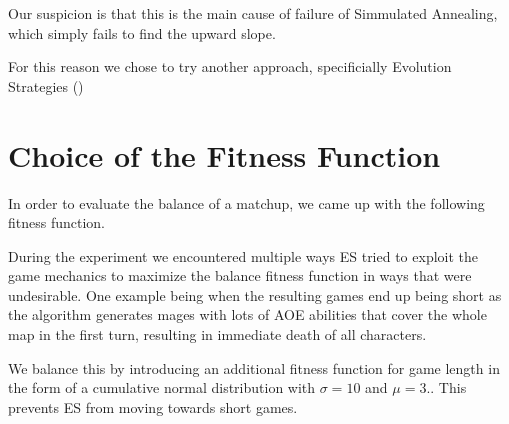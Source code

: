 Our suspicion is that this is the main cause of failure of Simmulated Annealing, which simply
fails to find the upward slope.

For this reason we chose to try another approach, specificially Evolution Strategies ()

\section{Choice of the Fitness Function}

In order to evaluate the balance of a matchup, we came up with the following fitness function.


During the experiment we encountered multiple ways ES tried to exploit the game
mechanics to maximize the balance fitness function in ways that were
undesirable. One example being when the resulting games end up being short as
the algorithm generates mages with lots of AOE abilities that cover the whole
map in the first turn, resulting in immediate death of all characters.

We balance this by introducing an additional fitness function for game length
in the form of a cumulative normal distribution with $\sigma = 10$ and $\mu =
3$..  This prevents ES from moving towards
short games.
